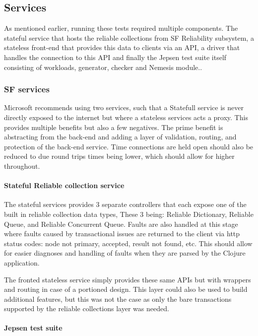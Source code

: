 \documentclass[a4paper,10pt,titlepage]{report}
\begin{document}
    \subsection{Services}
    As mentioned earlier, running these tests required multiple components. The stateful service that hosts the reliable collections from SF Reliability subsystem, a stateless front-end that provides this data to clients via an API, a driver that handles the connection to this API and finally the Jepsen test suite itself consisting of workloads, generator, checker and Nemesis module..

    \subsubsection{SF services}
    Microsoft recommends using two services, such that a Statefull service is never directly exposed to the internet but where a stateless services acts a proxy. This provides multiple benefits but also a few negatives. The prime benefit is abstracting from the back-end and adding a layer of validation, routing, and protection of the back-end service. Time connections are held open should also be reduced to due round trips times being lower, which should allow for higher throughout.

    \paragraph*{Stateful Reliable collection service}

    The stateful services provides 3 separate controllers that each expose one of the built in reliable collection data types, These 3 being: Reliable Dictionary, Reliable Queue, and Reliable Concurrent Queue. Faults are also handled at this stage where faults caused by transactional issues are returned to the client via http status codes\cite{wikihttpstatuscodes}: node not primary, accepted, result not found, etc. This should allow for easier diagnoses and handling of faults when they are parsed by the Clojure application.

    The fronted stateless service simply provides these same APIs but with wrappers and routing in case of a portioned design. This layer could also be used to build additional features, but this was not the case as only the bare transactions supported by the reliable collections layer was needed.

    \paragraph*{Jepsen test suite}
    
\end{document}
